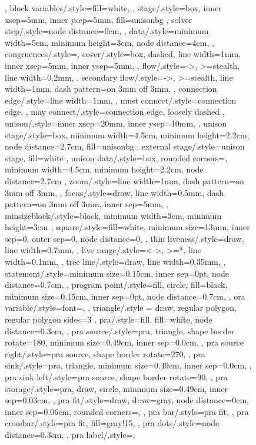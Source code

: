 \documentclass[acmsmall,authorversion,nonacm]{acmart}
\begin{document}
\begin{figure}
{{{{  },
  block variables/.style={fill=white,
  },
  stage/.style={box,
    inner xsep=5mm,
    inner ysep=5mm,
    fill=unisonbg
  },
  solver step/.style={node distance=0cm,
  },
  data/.style={minimum width=5cm,
    minimum height=3cm,
    node distance=4cm,
  },
  congruences/.style={},
  cover/.style={box,
    dashed,
    line width=1mm,
    inner xsep=5mm,
    inner ysep=5mm,
  },
  flow/.style={->,
    >=stealth,
    line width=0.2mm,
  },
  secondary flow/.style={->,
    >=stealth,
    line width=1mm,
    dash pattern=on 3mm off 3mm,
  },
  connection edge/.style={line width=1mm,
  },
  must connect/.style={connection edge,
  },
  may connect/.style={connection edge,
    loosely dashed
  },
  unison/.style={inner xsep=20mm,
    inner ysep=10mm,
  },
  unison stage/.style={box,
    minimum width=4.5cm,
    minimum height=2.2cm,
    node distance=2.7cm,
    fill=unisonbg
  },
  external stage/.style={unison stage,
    fill=white
  },
  unison data/.style={box,
    rounded corners=\cornerRadius,
    minimum width=4.5cm,
    minimum height=2.2cm,
    node distance=2.7cm
  },
  zoom/.style={line width=1mm,
    dash pattern=on 3mm off 3mm,
  },
  focus/.style={draw,
    line width=0.5mm,
    dash pattern=on 3mm off 3mm,
    inner sep=5mm,
  },
  minsizeblock/.style={block,
    minimum width=3cm,
    minimum height=3cm
  },
  square/.style={fill=white,
    minimum size=13mm,
    inner sep=0,
    outer sep=0,
    node distance=0,
  },
  thin liveness/.style={draw,
    line width=0.7mm,
  },
  live range/.style={<->,
      >=*,
      line width=0.1mm,
    },
  tree line/.style={draw,
    line width=0.35mm,
  },
  statement/.style={minimum size=0.15cm,
    inner sep=0pt,
    node distance=0.7cm,
  },
  program point/.style={fill,
    circle,
    fill=black,
    minimum size=0.15cm,
    inner sep=0pt,
    node distance=0.7cm,
  },
  ora variable/.style={font=\small,
  },
  triangle/.style = {draw, regular polygon, regular polygon sides=3 },
  pra/.style={fill,
    fill=white,
    node distance=0.3cm,
  },
  pra source/.style={pra,
    triangle,
    shape border rotate=180,
    minimum size=0.49cm,
    inner sep=0.0cm,
  },
  pra source right/.style={pra source,
    shape border rotate=270,
  },
  pra sink/.style={pra,
    triangle,
    minimum size=0.49cm,
    inner sep=0.0cm,
  },
  pra sink left/.style={pra source,
    shape border rotate=90,
  },
  pra storage/.style={pra,
    draw,
    circle,
    minimum size=0.49cm,
    inner sep=0.03cm,
  },
  pra fit/.style={draw,
    draw=gray,
    node distance=0cm,
    inner sep=0.06cm,
    rounded corners=\cornerRadius,
  },
  pra bar/.style={pra fit,
  },
  pra crossbar/.style={pra fit,
    fill=gray!15,
  },
  pra dots/.style={node distance=0.3cm,
  },
  pra label/.style={},
} 

}}
\end{figure}
\end{document}
